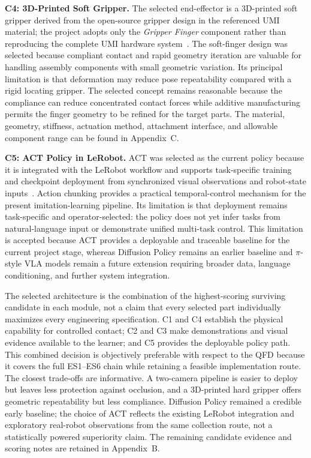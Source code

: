 \documentclass[12pt, letterpaper]{article}
\begin{document}
  \noindent\textbf{C4: 3D-Printed Soft Gripper.}
  The selected end-effector is a 3D-printed soft gripper derived from the open-source gripper design in the referenced
  UMI material; the project adopts only the \textit{Gripper Finger} component rather than reproducing the complete UMI
  hardware system~\cite{umi}. The soft-finger design was selected because compliant contact and rapid geometry iteration
  are valuable for handling assembly components with small geometric variation. Its principal limitation is that
  deformation may reduce pose repeatability compared with a rigid locating gripper. The selected concept remains
  reasonable because the compliance can reduce concentrated contact forces while additive manufacturing permits the
  finger geometry to be refined for the target parts. The material, geometry, stiffness, actuation method, attachment
  interface, and allowable component range can be found in Appendix~C.

  \noindent\textbf{C5: ACT Policy in LeRobot.}
  ACT was selected as the current policy because it is integrated with the LeRobot workflow and supports task-specific
  training and checkpoint deployment from synchronized visual observations and robot-state inputs~\cite{act,lerobot}.
  Action chunking provides a practical temporal-control mechanism for the present imitation-learning pipeline. Its
  limitation is that deployment remains task-specific and operator-selected: the policy does not yet infer tasks from
  natural-language input or demonstrate unified multi-task control. This limitation is accepted because ACT provides a
  deployable and traceable baseline for the current project stage, whereas Diffusion Policy remains an earlier baseline
  and $\pi$-style VLA models remain a future extension requiring broader data, language conditioning, and further system
  integration.

The selected architecture is the combination of the highest-scoring surviving candidate in each module, not a claim that every selected part individually maximizes every engineering specification. C1 and C4 establish the physical capability for controlled contact; C2 and C3 make demonstrations and visual evidence available to the learner; and C5 provides the deployable policy path. This combined decision is objectively preferable with respect to the QFD because it covers the full ES1--ES6 chain while retaining a feasible implementation route. The closest trade-offs are informative. A two-camera pipeline is easier to deploy but leaves less protection against occlusion, and a 3D-printed hard gripper offers geometric repeatability but less compliance. Diffusion Policy remained a credible early baseline; the choice of ACT reflects the existing LeRobot integration and exploratory real-robot observations from the same collection route, not a statistically powered superiority claim. The remaining candidate evidence and scoring notes are retained in Appendix~B.
\end{document}
